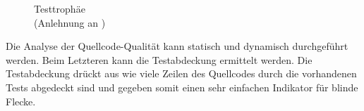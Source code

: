 \begin{figure}%
    \vspace{-2em}
    \centering
    \captionsetup{labelsep=newline,format=plain,justification=centering}
    \caption{Testtrophäe\\(Anlehnung an )}\label{fig:test-trophy}
    \vspace{.75em}
\end{figure}%
%
%
Die Analyse der Quellcode-Qualität kann statisch und dynamisch durchgeführt werden.
Beim Letzteren kann \zB die Testabdeckung ermittelt werden.
Die Testabdeckung drückt aus wie viele Zeilen des Quellcodes durch die vorhandenen Tests abgedeckt sind und gegeben somit einen sehr einfachen Indikator für blinde Flecke.
